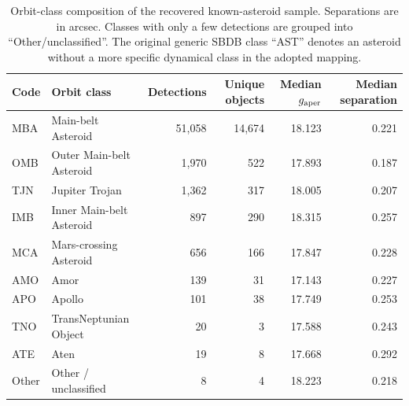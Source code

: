 \begin{table}
\centering
\caption{Orbit-class composition of the recovered known-asteroid sample. Separations are in arcsec. Classes with only a few detections are grouped into ``Other/unclassified''. The original generic SBDB class ``AST'' denotes an asteroid without a more specific dynamical class in the adopted mapping.}
\label{tab:orbit_class}
\footnotesize
\setlength{\tabcolsep}{6pt}
\renewcommand{\arraystretch}{1.12}
\begin{tabular}{llrrrr}
\toprule
Code & Orbit class & Detections & Unique objects & Median $g_{\rm aper}$ & Median separation \\
\midrule
MBA & Main-belt Asteroid & 51,058 & 14,674 & 18.123 & 0.221 \\
OMB & Outer Main-belt Asteroid & 1,970 & 522 & 17.893 & 0.187 \\
TJN & Jupiter Trojan & 1,362 & 317 & 18.005 & 0.207 \\
IMB & Inner Main-belt Asteroid & 897 & 290 & 18.315 & 0.257 \\
MCA & Mars-crossing Asteroid & 656 & 166 & 17.847 & 0.228 \\
AMO & Amor & 139 & 31 & 17.143 & 0.227 \\
APO & Apollo & 101 & 38 & 17.749 & 0.253 \\
TNO & TransNeptunian Object & 20 & 3 & 17.588 & 0.243 \\
ATE & Aten & 19 & 8 & 17.668 & 0.292 \\
Other & Other / unclassified & 8 & 4 & 18.223 & 0.218 \\
\bottomrule
\end{tabular}
\end{table}
